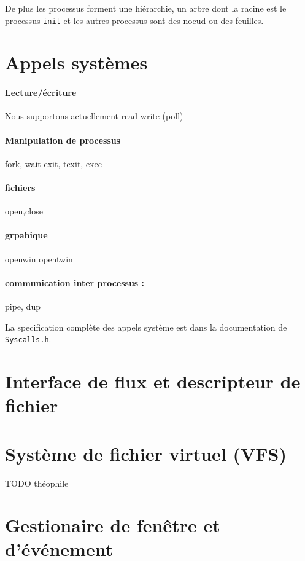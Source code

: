 \documentclass[12pt]{report}
\begin{document}
De plus les processus forment une hiérarchie, un arbre dont la racine est le
processus \verb$init$ et les autres processus sont des noeud ou des feuilles.

\section{Appels systèmes}

\paragraph{Lecture/écriture}

Nous supportons actuellement read write  (poll)

\paragraph{Manipulation de processus} fork, wait exit, texit, exec

\paragraph{fichiers} open,close

\paragraph{grpahique} openwin opentwin

\paragraph{communication inter processus :} pipe, dup


La specification complète des appels système est dans la documentation de \verb$Syscalls.h$.

\section{Interface de flux et descripteur de fichier}


\section{Système de fichier virtuel (VFS)}

TODO théophile

\section{Gestionaire de fenêtre et d'événement}
\end{document}
